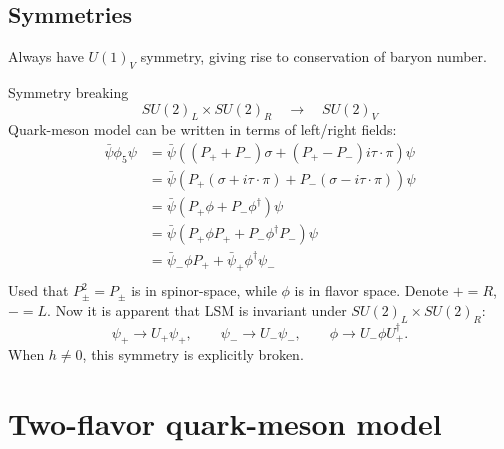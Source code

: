 \subsection{Symmetries}

Always have $U(1)_V$ symmetry, giving rise to conservation of baryon number.

Symmetry breaking
\begin{equation}
	SU(2)_L \times SU(2)_R \quad \rightarrow \quad SU(2)_V
\end{equation}
Quark-meson model can be written in terms of left/right fields:
\begin{equation}
\begin{split}
	\bar{\psi} \phi_5 \psi &= \bar{\psi} ( (P_+ + P_-) \sigma + (P_+ - P_-) i \tau \cdot \pi) \psi \\
	                       &= \bar{\psi} ( P_+ (\sigma + i \tau \cdot \pi) + P_- (\sigma - i \tau \cdot \pi) ) \psi \\
	                       &= \bar{\psi} ( P_+ \phi + P_- \phi^\dagger) \psi \\
	                       &= \bar{\psi} ( P_+ \phi P_+ + P_- \phi^\dagger P_-) \psi \\
	                       &= \bar{\psi}_- \phi P_+ + \bar{\psi}_+ \phi^\dagger \psi_- \\
\end{split}
\end{equation}
Used that $P_\pm^2 = P_\pm$ is in spinor-space, while $\phi$ is in flavor space.
Denote $+ = R$, $- = L$.
Now it is apparent that LSM is invariant under $SU(2)_L \times SU(2)_R$:
\begin{equation}
	\psi_+ \rightarrow U_+ \psi_+, \qquad
	\psi_- \rightarrow U_- \psi_-, \qquad
	\phi   \rightarrow U_- \phi U_+^\dagger.
\end{equation}
When $h \neq 0$, this symmetry is explicitly broken.



\section{Two-flavor quark-meson model}


